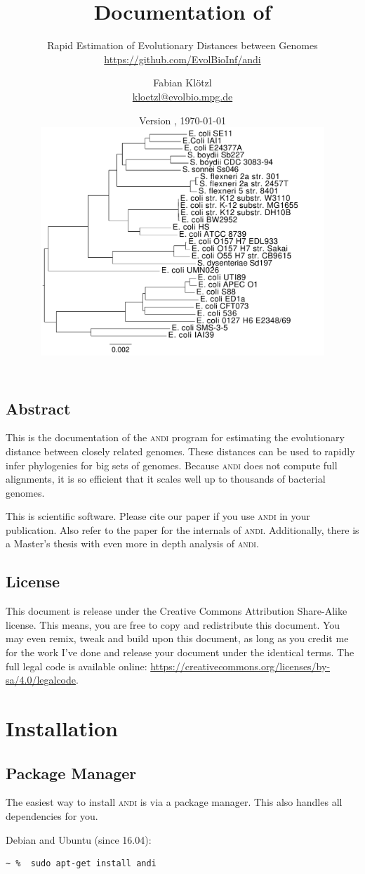 \documentclass[a4paper,
  10pt,
  english,
  DIV=12,
  BCOR=8mm]{scrbook}
\title{Documentation of \algo{andi}}
\subtitle{Rapid Estimation of Evolutionary Distances between Genomes\\ {\small\url{https://github.com/EvolBioInf/andi}}}
\author{Fabian Klötzl\\ \href{mailto:kloetzl@evolbio.mpg.de}{kloetzl@evolbio.mpg.de}}
\date{Version \version, \isodate\today \\
\vspace*{2cm}
\centering\includegraphics[width=0.8\textwidth]{andi_labels.pdf}}
\newcommand{\algo}[1]{\textsc{{#1}}}
\newcommand{\andi}{\algo{andi}\xspace}
\begin{document}
\maketitle

\section*{Abstract}
This is the documentation of the \andi program for estimating the evolutionary distance between closely related genomes. These distances can be used to rapidly infer phylogenies for big sets of genomes. Because \andi does not compute full alignments, it is so efficient that it scales well up to thousands of bacterial genomes.

This is scientific software. Please cite our paper \cite{andi} if you use \andi in your publication. Also refer to the paper for the internals of \andi. Additionally, there is a Master's thesis with even more in depth analysis of \andi \cite{kloetzl}.

\vspace*{1cm}
\section*{License}
This document is release under the Creative Commons Attribution Share-Alike license. This means, you are free to copy and redistribute this document. You may even remix, tweak and build upon this document, as long as you credit me for the work I've done and release your document under the identical terms. The full legal code is available online: {\small\url{https://creativecommons.org/licenses/by-sa/4.0/legalcode}}.

\tableofcontents

\chapter{Installation} %

\section{Package Manager}

The easiest way to install \andi is via a package manager. This also handles all dependencies for you.


\noindent Debian and Ubuntu (since 16.04):

\begin{lstlisting}
~ %  sudo apt-get install andi
\end{lstlisting}
\end{document}

